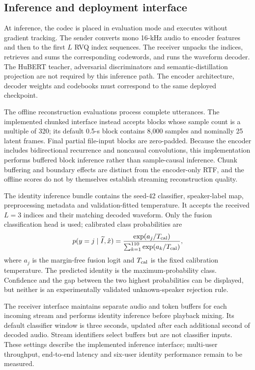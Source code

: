\documentclass[final,5p,times,twocolumn]{elsarticle}
\begin{document}
\subsection{Inference and deployment interface}
At inference, the codec is placed in evaluation mode and executes without gradient tracking. The sender converts mono 16-kHz audio to encoder features and then to the first $L$ RVQ index sequences. The receiver unpacks the indices, retrieves and sums the corresponding codewords, and runs the waveform decoder. The HuBERT teacher, adversarial discriminators and semantic-distillation projection are not required by this inference path. The encoder architecture, decoder weights and codebooks must correspond to the same deployed checkpoint.

The offline reconstruction evaluations process complete utterances. The implemented chunked interface instead accepts blocks whose sample count is a multiple of 320; its default 0.5-s block contains 8,000 samples and nominally 25 latent frames. Final partial file-input blocks are zero-padded. Because the encoder includes bidirectional recurrence and noncausal convolutions, this implementation performs buffered block inference rather than sample-causal inference. Chunk buffering and boundary effects are distinct from the encoder-only RTF, and the offline scores do not by themselves establish streaming reconstruction quality.

The identity inference bundle contains the seed-42 classifier, speaker-label map, preprocessing metadata and validation-fitted temperature. It accepts the received $L=3$ indices and their matching decoded waveform. Only the fusion classification head is used; calibrated class probabilities are
\begin{equation}
 p(y=j\mid \widetilde I,\hat{x})
 =\frac{\exp(a_j/T_{\rm cal})}
 {\sum_{k=1}^{110}\exp(a_k/T_{\rm cal})},
\end{equation}
where $a_j$ is the margin-free fusion logit and $T_{\rm cal}$ is the fixed calibration temperature. The predicted identity is the maximum-probability class. Confidence and the gap between the two highest probabilities can be displayed, but neither is an experimentally validated unknown-speaker rejection rule.

The receiver interface maintains separate audio and token buffers for each incoming stream and performs identity inference before playback mixing. Its default classifier window is three seconds, updated after each additional second of decoded audio. Stream identifiers select buffers but are not classifier inputs. These settings describe the implemented inference interface; multi-user throughput, end-to-end latency and six-user identity performance remain to be measured.
\end{document}
